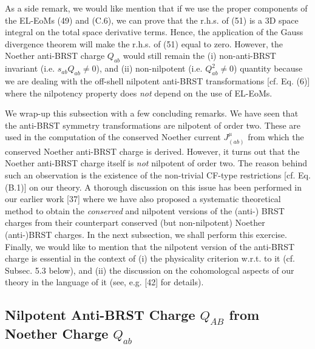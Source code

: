 \documentclass[12pt]{article}
\begin{document}
As a side remark, we would like mention that if we use the proper components of the EL-EoMs (49) and (C.6), we can prove that the r.h.s. of
(51) is a 3D space integral on the total space derivative terms. Hence, the application of the Gauss divergence theorem will make
the r.h.s. of (51) equal to zero. However, the Noether anti-BRST charge $Q_{ab}$ would still remain the (i) non-anti-BRST invariant  
(i.e. $s_{ab} Q_{ab} \neq 0 $), and (ii) non-nilpotent (i.e. $Q_{ab}^2 \neq 0 $) quantity because we are dealing
with the off-shell nilpotent anti-BRST transformations [cf. Eq. (6)] where the nilpotency property does {\it not} depend on the use of EL-EoMs. 







We wrap-up this subsection with a few concluding remarks. We have seen that the anti-BRST symmetry transformations are nilpotent of order two. These
are used in the computation of the conserved Noether current $J^\mu_{(ab)} $ from which the conserved Noether anti-BRST charge is derived. However,
it turns out that the Noether anti-BRST charge itself is {\it not} nilpotent of order two. The reason behind such an observation is the existence of the
non-trivial CF-type restrictions [cf. Eq. (B.1)] on our theory. A thorough discussion on this issue has been performed in our earlier work [37]
where we have also proposed a systematic theoretical method to obtain the {\it conserved} and nilpotent versions of the (anti-) BRST charges
from their counterpart conserved (but non-nilpotent) Noether (anti-)BRST charges. In the next subsection, we shall perform this exercise. Finally,
we would like to mention that the nilpotent version of the anti-BRST charge is essential in the context of (i) the physicality criterion w.r.t. to it
(cf. Subsec. 5.3 below),
and (ii) the discussion on the cohomologcal aspects of our theory in the language of it (see, e.g. [42] for details).\\




\subsection{Nilpotent Anti-BRST Charge $Q_{AB}$ from Noether Charge $Q_{ab}$ }
\end{document}
